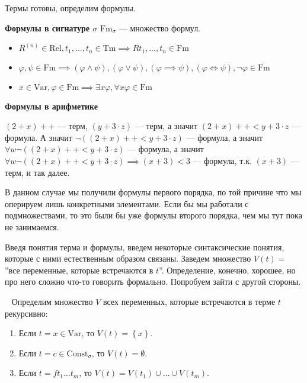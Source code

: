 \documentclass[a4paper, fleqn]{article}
\begin{document}
    Термы готовы, определим формулы.

    \begin{definition}
        \textbf{Формулы в сигнатуре $\sigma$} $\text{Fm}_\sigma$ --- множество формул.
        \begin{itemize}
            \item $R^{(n)} \in \text{Rel}, t_1, \dots, t_n \in \text{Tm} \implies R t_1, \dots, t_n
            \in \text{Fm}$
            \item $\varphi, \psi \in \text{Fm} \implies (\varphi \land \psi), (\varphi \lor \psi),
            (\varphi \implies \psi), (\varphi \iff \psi), \neg \varphi \in \text{Fm}$
            \item $x \in \text{Var}, \varphi \in \text{Fm} \implies \exists x \varphi, \forall x \varphi
            \in \text{Fm}$
        \end{itemize}
    \end{definition}

    \begin{example}
        \textbf{Формулы в арифметике}

        $(2 + x)++$ --- терм, $(y + 3 \cdot z)$ --- терм, а значит $(2 + x)++ < y + 3 \cdot z$ ---
        формула. А значит $\neg((2 + x)++ < y + 3 \cdot z)$ --- формула, а значит $\forall w \neg((2 + x)++ < y + 3 \cdot z)$
        --- формула, а значит $\forall w \neg((2 + x)++ < y + 3 \cdot z) \implies (x + 3) < 3$ --- формула,
        т.к. $(x + 3)$ --- терм, и так далее.
    \end{example}

    В данном случае мы получили формулы первого порядка, по той причине что мы оперируем лишь конкретными
    элементами. Если бы мы работали с подмножествами, то это были бы уже формулы второго порядка, чем
    мы тут пока не занимаемся.

    Введя понятия терма и формулы, введем некоторые синтаксические понятия, которые с ними естественным образом связаны.
    Заведем множество $V(t) = $ ''все переменные, которые встречаются в $t$''.
    Определение, конечно, хорошее, но про него сложно что-то говорить формально.
    Попробуем зайти с другой стороны.
    \begin{definition}~ \label{def::variables-in-term}
        Определим множество $V$ всех переменных, которые встречаются в терме $t$ рекурсивно:
        \begin{enumerate}
            \item Если $t = x \in \text{Var}$, то $V(t) = \left\{x\right\}$.
            \item Если $t = c \in \text{Const}_{\sigma}$, то $V(t) = \emptyset$.
            \item Если $t = f t_{1} \ldots t_{m}$, то $V(t) = V(t_{1}) \cup \ldots \cup V(t_{m})$.
        \end{enumerate}
    \end{definition}
\end{document}

